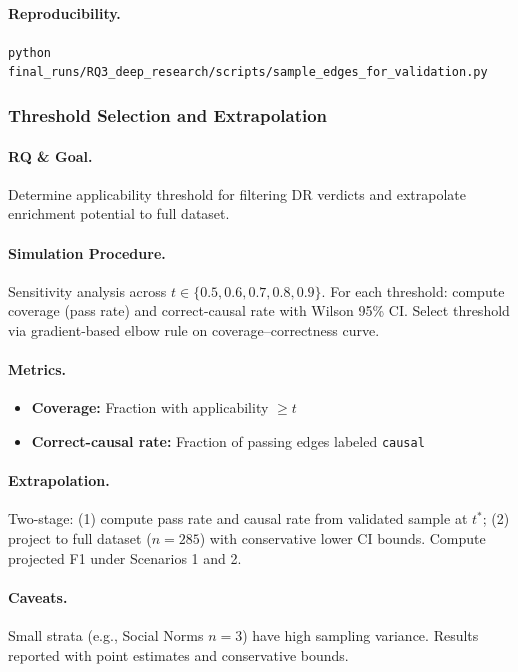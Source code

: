 \paragraph{Reproducibility.}
\texttt{python final\_runs/RQ3\_deep\_research/scripts/sample\_edges\_for\_validation.py}

\subsubsection{Threshold Selection and Extrapolation}
\label{sec:rq3_threshold_selection}

\paragraph{RQ \& Goal.}
Determine applicability threshold for filtering DR verdicts and extrapolate enrichment potential to full dataset.

\paragraph{Simulation Procedure.}
Sensitivity analysis across $t \in \{0.5, 0.6, 0.7, 0.8, 0.9\}$. For each threshold: compute coverage (pass rate) and correct-causal rate with Wilson 95\% CI. Select threshold via gradient-based elbow rule on coverage--correctness curve.

\paragraph{Metrics.}
\begin{itemize}[noitemsep]
    \item \textbf{Coverage:} Fraction with applicability $\geq t$
    \item \textbf{Correct-causal rate:} Fraction of passing edges labeled \texttt{causal}
\end{itemize}

\paragraph{Extrapolation.}
Two-stage: (1) compute pass rate and causal rate from validated sample at $t^*$; (2) project to full dataset ($n=285$) with conservative lower CI bounds. Compute projected F1 under Scenarios 1 and 2.

\paragraph{Caveats.}
Small strata (e.g., Social Norms $n=3$) have high sampling variance. Results reported with point estimates and conservative bounds.

